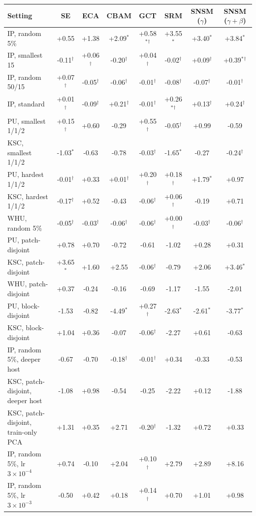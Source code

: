 \begin{tabular}{lccccccc}
\toprule
Setting & SE & ECA & CBAM & GCT & SRM & SNSM ($\gamma$) & SNSM ($\gamma{+}\beta$) \\
\midrule
IP, random 5\% & +0.55 & +1.38 & +2.09$^{*}$ & +0.58$^{*}$$^{\dagger}$ & +3.55$^{*}$ & +3.40$^{*}$ & +3.84$^{*}$ \\
IP, smallest 15 & -0.11$^{\dagger}$ & +0.06$^{\dagger}$ & -0.20$^{\dagger}$ & +0.04$^{\dagger}$ & -0.02$^{\dagger}$ & +0.09$^{\dagger}$ & +0.39$^{*}$$^{\dagger}$ \\
IP, random 50/15 & +0.07$^{\dagger}$ & -0.05$^{\dagger}$ & -0.06$^{\dagger}$ & -0.01$^{\dagger}$ & -0.08$^{\dagger}$ & -0.07$^{\dagger}$ & -0.01$^{\dagger}$ \\
IP, standard & +0.01$^{\dagger}$ & -0.09$^{\dagger}$ & +0.21$^{\dagger}$ & -0.01$^{\dagger}$ & +0.26$^{*}$$^{\dagger}$ & +0.13$^{\dagger}$ & +0.24$^{\dagger}$ \\
\midrule
PU, smallest 1/1/2 & +0.15$^{\dagger}$ & +0.60 & -0.29 & +0.55$^{\dagger}$ & -0.05$^{\dagger}$ & +0.99 & -0.59 \\
KSC, smallest 1/1/2 & -1.03$^{*}$ & -0.63 & -0.78 & -0.03$^{\dagger}$ & -1.65$^{*}$ & -0.27 & -0.24$^{\dagger}$ \\
PU, hardest 1/1/2 & -0.01$^{\dagger}$ & +0.33 & +0.01$^{\dagger}$ & +0.20$^{\dagger}$ & +0.18$^{\dagger}$ & +1.79$^{*}$ & +0.97 \\
KSC, hardest 1/1/2 & -0.17$^{\dagger}$ & +0.52 & -0.43 & -0.06$^{\dagger}$ & +0.06$^{\dagger}$ & -0.19 & +0.71 \\
\midrule
WHU, random 5\% & -0.05$^{\dagger}$ & -0.03$^{\dagger}$ & -0.06$^{\dagger}$ & -0.06$^{\dagger}$ & +0.00$^{\dagger}$ & -0.03$^{\dagger}$ & -0.06$^{\dagger}$ \\
PU, patch-disjoint & +0.78 & +0.70 & -0.72 & -0.61 & -1.02 & +0.28 & +0.31 \\
KSC, patch-disjoint & +3.65$^{*}$ & +1.60 & +2.55 & -0.06$^{\dagger}$ & -0.79 & +2.06 & +3.46$^{*}$ \\
WHU, patch-disjoint & +0.37 & -0.24 & -0.16 & -0.69 & -1.17 & -1.55 & -2.01 \\
PU, block-disjoint & -1.53 & -0.82 & -4.49$^{*}$ & +0.27$^{\dagger}$ & -2.63$^{*}$ & -2.61$^{*}$ & -3.77$^{*}$ \\
KSC, block-disjoint & +1.04 & +0.36 & -0.07 & -0.06$^{\dagger}$ & -2.27 & +0.61 & -0.63 \\
\midrule
IP, random 5\%, deeper host & -0.67 & -0.70 & -0.18$^{\dagger}$ & -0.01$^{\dagger}$ & +0.34 & -0.33 & -0.53 \\
KSC, patch-disjoint, deeper host & -1.08 & +0.98 & -0.54 & -0.25 & -2.22 & +0.12 & -1.88 \\
KSC, patch-disjoint, train-only PCA & +1.31 & +0.35 & +2.71 & -0.20$^{\dagger}$ & -1.32 & +0.72 & +0.33 \\
IP, random 5\%, lr $3\times10^{-4}$ & +0.74 & -0.10 & +2.04 & +0.10$^{\dagger}$ & +2.79 & +2.89 & +8.16 \\
IP, random 5\%, lr $3\times10^{-3}$ & -0.50 & +0.42 & +0.18 & +0.14$^{\dagger}$ & +0.70 & +1.01 & +0.98 \\
\bottomrule
\end{tabular}
